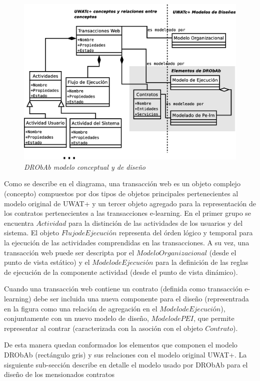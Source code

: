 \documentclass{llncs}
\begin{document}
	\begin{figure}[!h]
        \begin{center}
	\includegraphics[width=5 in,totalheight=3 in]{drobab.eps}
	\caption{\small \sl DRObAb modelo conceptual y de diseño} \label{drobab2}
         \end{center}
         \end{figure}


Como se describe en el diagrama, una transacción web es un objeto complejo (concepto) compuestos por dos tipos de objetos principales pertenecientes al modelo original de UWAT+ y un tercer objeto  agregado para la representación de los contratos pertenecientes a las transacciones e-learning. En el primer grupo se encuentra $Actividad$ para la distinción de las actividades de los usuarios y del sistema. El objeto $Flujo de Ejecución$ representa del órden lógico y temporal para la ejecución de las actividades comprendidas en las transacciones. A su vez, una transacción web puede ser descripta por el $Modelo Organizacional$ (desde el punto de vista estático) y el $Modelo de Ejecución$ para la definición de las reglas de ejecución de la componente actividad (desde el punto de vista dinámico). 

Cuando una transacción web contiene un contrato (definida como transacción e-learning) debe ser incluida una nueva componente para el diseño (representrada en la figura como una relación de agregación en el $Modelo de Ejecución$), conjuntamente con un nuevo modelo de diseño, $Modelo de PEI$, que permite representar al contrar (caracterizada con la asoción con el objeto $Contrato$).

De esta manera quedan conformados los elementos que componen el modelo DRObAb (rectángulo gris) y sus relaciones con el modelo original UWAT+. La sisguiente sub-sección describe en detalle el modelo usado por DRObAb para el diseño de los mensionados contratos  
\end{document}
